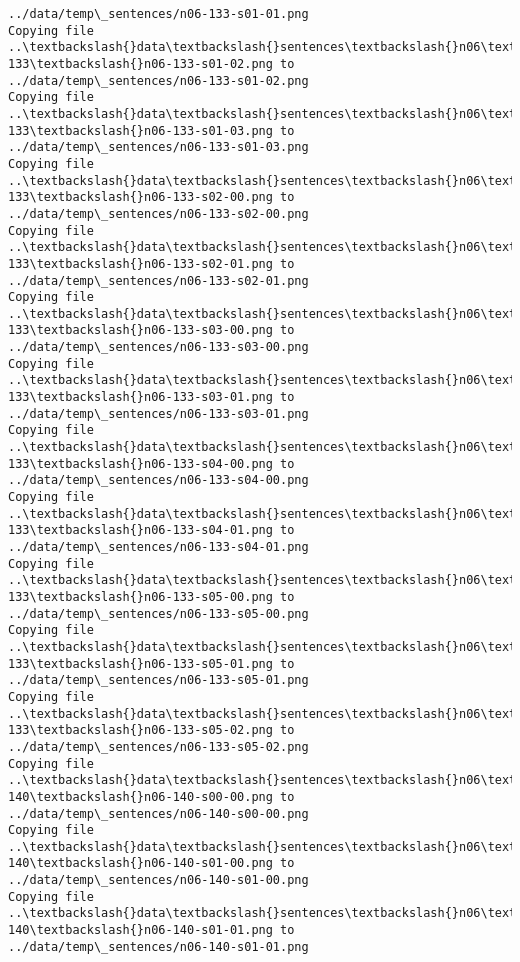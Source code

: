 \documentclass[11pt]{article}
\begin{document}
\begin{Verbatim}[commandchars=\\\{\}]
../data/temp\_sentences/n06-133-s01-01.png
Copying file ..\textbackslash{}data\textbackslash{}sentences\textbackslash{}n06\textbackslash{}n06-133\textbackslash{}n06-133-s01-02.png to
../data/temp\_sentences/n06-133-s01-02.png
Copying file ..\textbackslash{}data\textbackslash{}sentences\textbackslash{}n06\textbackslash{}n06-133\textbackslash{}n06-133-s01-03.png to
../data/temp\_sentences/n06-133-s01-03.png
Copying file ..\textbackslash{}data\textbackslash{}sentences\textbackslash{}n06\textbackslash{}n06-133\textbackslash{}n06-133-s02-00.png to
../data/temp\_sentences/n06-133-s02-00.png
Copying file ..\textbackslash{}data\textbackslash{}sentences\textbackslash{}n06\textbackslash{}n06-133\textbackslash{}n06-133-s02-01.png to
../data/temp\_sentences/n06-133-s02-01.png
Copying file ..\textbackslash{}data\textbackslash{}sentences\textbackslash{}n06\textbackslash{}n06-133\textbackslash{}n06-133-s03-00.png to
../data/temp\_sentences/n06-133-s03-00.png
Copying file ..\textbackslash{}data\textbackslash{}sentences\textbackslash{}n06\textbackslash{}n06-133\textbackslash{}n06-133-s03-01.png to
../data/temp\_sentences/n06-133-s03-01.png
Copying file ..\textbackslash{}data\textbackslash{}sentences\textbackslash{}n06\textbackslash{}n06-133\textbackslash{}n06-133-s04-00.png to
../data/temp\_sentences/n06-133-s04-00.png
Copying file ..\textbackslash{}data\textbackslash{}sentences\textbackslash{}n06\textbackslash{}n06-133\textbackslash{}n06-133-s04-01.png to
../data/temp\_sentences/n06-133-s04-01.png
Copying file ..\textbackslash{}data\textbackslash{}sentences\textbackslash{}n06\textbackslash{}n06-133\textbackslash{}n06-133-s05-00.png to
../data/temp\_sentences/n06-133-s05-00.png
Copying file ..\textbackslash{}data\textbackslash{}sentences\textbackslash{}n06\textbackslash{}n06-133\textbackslash{}n06-133-s05-01.png to
../data/temp\_sentences/n06-133-s05-01.png
Copying file ..\textbackslash{}data\textbackslash{}sentences\textbackslash{}n06\textbackslash{}n06-133\textbackslash{}n06-133-s05-02.png to
../data/temp\_sentences/n06-133-s05-02.png
Copying file ..\textbackslash{}data\textbackslash{}sentences\textbackslash{}n06\textbackslash{}n06-140\textbackslash{}n06-140-s00-00.png to
../data/temp\_sentences/n06-140-s00-00.png
Copying file ..\textbackslash{}data\textbackslash{}sentences\textbackslash{}n06\textbackslash{}n06-140\textbackslash{}n06-140-s01-00.png to
../data/temp\_sentences/n06-140-s01-00.png
Copying file ..\textbackslash{}data\textbackslash{}sentences\textbackslash{}n06\textbackslash{}n06-140\textbackslash{}n06-140-s01-01.png to
../data/temp\_sentences/n06-140-s01-01.png

\end{Verbatim}
\end{document}
